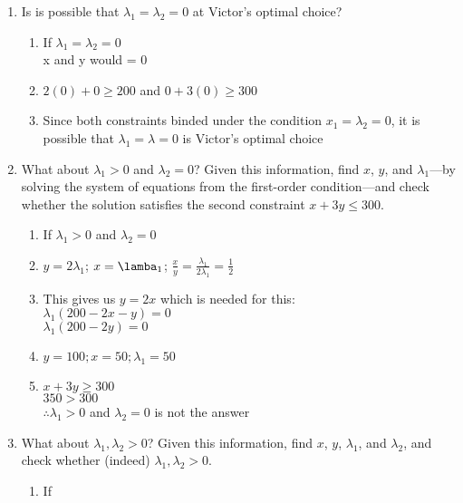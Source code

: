 \documentclass[11pt]{article}
\begin{document}
\begin{enumerate}
\begin{enumerate}
        \item Is is possible that $\lambda_{1}=\lambda_{2}=0$ at Victor's optimal choice?

            \begin{enumerate}
                \item If $\lambda_1 = \lambda_2 = 0$\\
                x and y would = 0 
                \item $2(0) + 0 \geq 200$ and $0 +3(0) \geq 300$
                \item Since both constraints binded under the condition $x_1 = \lambda_2 = 0$, it is possible that $\lambda_1 = \lambda = 0$ is Victor's optimal choice
            \end{enumerate}

        \item What about $\lambda_{1}>0$ and $\lambda_{2}=0$? Given this information, find $x$, $y$, and $\lambda_{1}$---by solving the system of equations from the first-order condition---and check whether the solution satisfies the second constraint $x+3y\leq 300$.
        
            \begin{enumerate}
                \item If $\lambda_1 > 0$ and $\lambda_2 = 0$
                \item $y = 2\lambda_1$; $x = \lamba_1$; $\frac{x}{y} = \frac{\lambda_1}{2\lambda_1} = \frac{1}{2}$\\
                \item This gives us $y= 2x$ which is needed for this:\\
                $\lambda_1 (200-2x-y) = 0$\\
                $\lambda_1 (200 -2y) = 0$
                \item $y =100; x = 50; \lambda_1 = 50$
                \item $x + 3y \geq 300$\\
                $350 > 300$\\
                $\therefore \lambda_1 > 0$ and $\lambda_2 = 0$ is not the answer
                
            \end{enumerate}

        \item What about $\lambda_{1},\lambda_{2}>0$? Given this information, find $x$, $y$, $\lambda_{1}$, and $\lambda_{2}$, and check whether (indeed) $\lambda_{1},\lambda_{2}>0$.
        
            \begin{enumerate}
                \item If
            \end{enumerate}
        
    \end{enumerate}


\end{enumerate}
\end{document}
